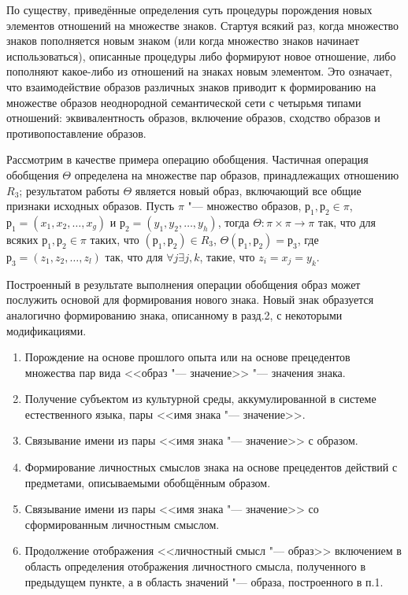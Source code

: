 По существу, приведённые определения суть процедуры порождения новых элементов отношений на множестве знаков. Стартуя всякий раз, когда множество знаков пополняется новым знаком (или когда множество знаков начинает использоваться), описанные процедуры либо формируют новое отношение, либо пополняют какое-либо из отношений на знаках новым элементом. Это означает, что взаимодействие образов различных знаков приводит к формированию на множестве образов неоднородной семантической сети \cite{Osipov1990} с четырьмя типами отношений: эквивалентность образов, включение образов, сходство образов и противопоставление образов.

Рассмотрим в качестве примера операцию обобщения. Частичная операция обобщения $\Theta$ определена на множестве пар образов, принадлежащих отношению $R_3$; результатом работы $\Theta$ является новый образ, включающий все общие признаки исходных образов. Пусть $\pi$ "--- множество образов, $р_1,р_2\in\pi$, $р_1=(x_1,x_2,\dots,x_g)$ и $р_2=(y_1,y_2,\dots,y_h)$, тогда $\Theta:\pi\times\pi\rightarrow\pi$ так, что для всяких $р_1,р_2\in\pi$ таких, что $(р_1,р_2)\in R_3$, $\Theta(р_1,р_2)=р_3$, где $р_3=(z_1,z_2,\dots,z_l)$ так, что для $\forall j\exists j,k$, такие, что $z_i=x_j=y_k$.

Построенный в результате выполнения операции обобщения образ может послужить основой для формирования нового знака. Новый знак образуется аналогично формированию знака, описанному в разд.2, с некоторыми модификациями.
\begin{enumerate}
	\renewcommand\labelenumi{\theenumi.}
	\item Порождение на основе прошлого опыта или на основе прецедентов множества пар вида <<образ "--- значение>> "--- значения знака.
	\item Получение субъектом из культурной среды, аккумулированной в системе естественного языка, пары <<имя знака "--- значение>>.
	\item Связывание имени из пары <<имя знака "--- значение>> с образом.
	\item Формирование личностных смыслов знака на основе прецедентов действий с предметами, описываемыми обобщённым образом.
	\item Связывание имени из пары <<имя знака "--- значение>> со сформированным личностным смыслом.
	\item Продолжение отображения <<личностный смысл "--- образ>> включением в область определения отображения личностного смысла, полученного в предыдущем пункте, а в область значений "--- образа, построенного в п.1.
\end{enumerate}

